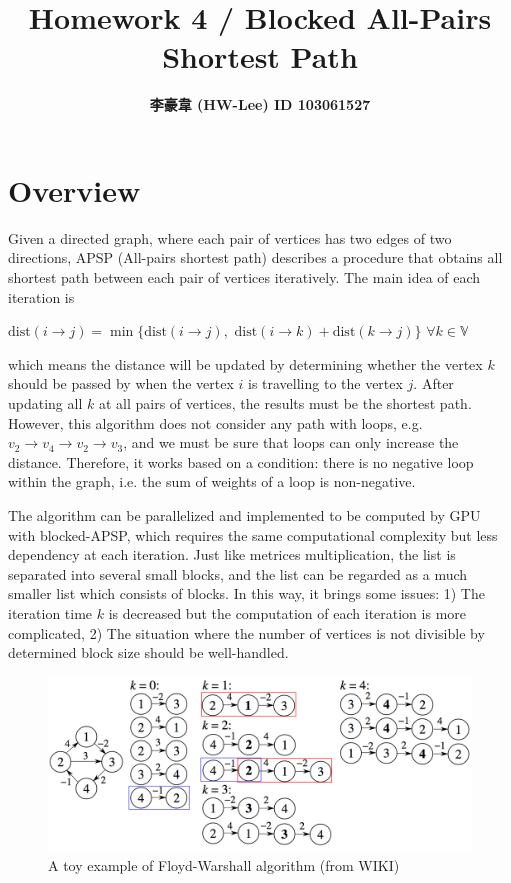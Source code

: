 \documentclass[12pt]{article}
\title{\textbf{ Homework 4 / Blocked All-Pairs Shortest Path }}
\author{\textbf{李豪韋 (HW-Lee) ID 103061527}}
\date{}
\begin{document}
\vspace*{-60pt}
{\let\newpage\relax\maketitle}
\thispagestyle{title}

\section*{Overview}
\vspace{-20pt}
\noindent\makebox[\linewidth]{\rule{\textwidth}{0.4pt}}
\vspace{5pt}

Given a directed graph, where each pair of vertices has two edges of two directions, APSP (All-pairs shortest path) describes a procedure that obtains all shortest path between each pair of vertices iteratively. The main idea of each iteration is
\begin{center}
    $\text{dist}(i \to j) = \min\big\{ \text{dist}(i \to j), \,\, \text{dist}(i \to k) + \text{dist}(k \to j) \big\} \,\, \forall k \in \mathbb{V}$
\end{center}
which means the distance will be updated by determining whether the vertex $k$ should be passed by when the vertex $i$ is travelling to the vertex $j$. After updating all $k$ at all pairs of vertices, the results must be the shortest path. However, this algorithm does not consider any path with loops, e.g. $v_2 \to v_4 \to v_2 \to v_3$, and we must be sure that loops can only increase the distance. Therefore, it works based on a condition: there is no negative loop within the graph, i.e. the sum of weights of a loop is non-negative.

The algorithm can be parallelized and implemented to be computed by GPU with blocked-APSP, which requires the same computational complexity but less dependency at each iteration. Just like metrices multiplication, the list is separated into several small blocks, and the list can be regarded as a much smaller list which consists of blocks. In this way, it brings some issues: 1) The iteration time $k$ is decreased but the computation of each iteration is more complicated, 2) The situation where the number of vertices is not divisible by determined block size should be well-handled.

\begin{center}
    \begin{figure}[ht]
        \includegraphics[scale=.45]{./Floyd-Warshall_example.png}
        \caption{A toy example of Floyd-Warshall algorithm (from WIKI)}
    \end{figure}
\end{center}
\end{document}

